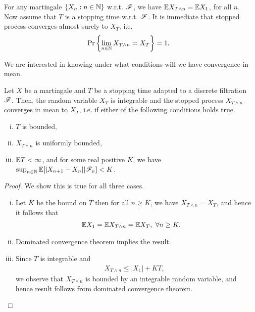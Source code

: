\documentclass[a4paper,10pt,english]{article}
\begin{document}
\begin{rem}
For any martingale $\{X_n: n \in \mathbb{N}\}$ w.r.t. $\mathscr{F}$, we have $\mathbb{E} X_{T\wedge n} =\mathbb{E} X_1$, for all $n$.  
Now assume that $T$ is a stopping time w.r.t. $\mathscr{F}$. 
It is immediate that stopped process converges almost surely to $X_T$, i.e. 
\begin{align*}
\Pr\left\{\lim_{n\in \mathbb{N}}{X}_{T\wedge n} = X_T\right\} = 1.
\end{align*}
\end{rem}
We are interested in knowing under what conditions will we have convergence in mean. %
\begin{thm}
\label{MartStopThm}
Let $X$ be a martingale and $T$ be a stopping time adapted to a discrete filtration $\mathscr{F}$. 
Then, the random variable $X_T$ is integrable and the stopped process $X_{T \wedge n}$ converges in mean to $X_T$, i.e.
if 
either of the following conditions holds true. 
\begin{enumerate}[(i)]
\item $T$ is bounded, 
\item $X_{T\wedge n}$ is uniformly bounded,
\item $\mathbb{E} T < \infty$, and for some real positive $K$, we have $\sup_{n \in \mathbb{N}}\mathbb{E}[|X_{n+1}-X_n||\mathscr{F}_n] < K$. 
\end{enumerate}
\end{thm}
\begin{proof} We show this is true for all three cases.
\begin{enumerate}[(i)] 
\item Let $K$ be the bound on $T$ then for all $n \geq K$, we have $X_{T\wedge n} = X_T$, and hence it follows that
\begin{align*}
\mathbb{E} X_1 = \mathbb{E} X_{T\wedge n} &= \mathbb{E} X_T, ~\forall n \geq K.
\end{align*}
\item Dominated convergence theorem implies the result. 
\item Since $T$ is integrable and  
\begin{align*} 
X_{T\wedge n} \leq |X_1| + K T,
\end{align*}
we observe that $X_{T\wedge n}$ is bounded by an integrable random variable, and hence result follows from dominated convergence theorem.
\end{enumerate}
\end{proof}
\end{document}
